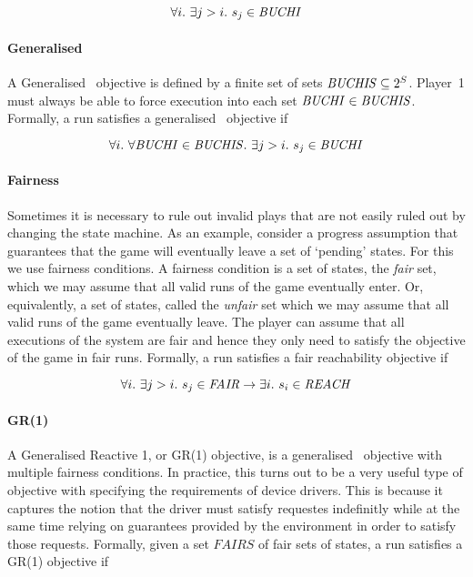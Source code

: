\begin{equation}
\forall i.\ \exists j>i.\ s_j \in \mathit{BUCHI}
\end{equation}

\paragraph{Generalised \buchi}
A Generalised \buchi\ objective is defined by a finite set of sets $\mathit{BUCHIS} \subseteq 2^S$. Player~1 must always be able to force execution into each set $\mathit{BUCHI} \in \mathit{BUCHIS}$. Formally, a run satisfies a generalised \buchi\ objective if 

\begin{equation}
\forall i.\ \forall \mathit{BUCHI} \in \mathit{BUCHIS}.\ \exists j>i.\ s_j \in \mathit{BUCHI}
\end{equation}

\paragraph{Fairness}
\label{sec:fairness}
Sometimes it is necessary to rule out invalid plays that are not easily ruled out by changing the state machine. As an example, consider a progress assumption that guarantees that the game will eventually leave a set of `pending' states. For this we use fairness conditions. A fairness condition is a set of states, the \emph{fair} set, which we may assume that all valid runs of the game eventually enter. Or, equivalently, a set of states, called the \emph{unfair} set which we may assume that all valid runs of the game eventually leave. The player can assume that all executions of the system are fair and hence they only need to satisfy the objective of the game in fair runs. Formally, a run satisfies a fair reachability objective if 

\begin{equation}
\forall i.\ \exists j>i.\ s_j \in \mathit{FAIR} \rightarrow \exists i.\ s_i \in \mathit{REACH}
\end{equation}

\paragraph{GR(1)}
\label{sec:gr1}
A Generalised Reactive 1, or GR(1) \cite{Piterman_PS_06} objective, is a generalised \buchi\ objective with multiple fairness conditions. In practice, this turns out to be a very useful type of objective with specifying the requirements of device drivers. This is because it captures the notion that the driver must satisfy requestes indefinitly while at the same time relying on guarantees provided by the environment in order to satisfy those requests. Formally, given a set $FAIRS$ of fair sets of states, a run satisfies a GR(1) objective if 

